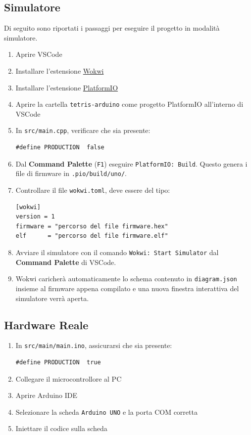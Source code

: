 \documentclass[a4paper, 12pt]{article}
\begin{document}
\subsection{Simulatore}
Di seguito sono riportati i passaggi per eseguire il progetto in modalità simulatore.
\begin{enumerate}
    \item Aprire VSCode
    \item Installare l'estensione \href{https://marketplace.visualstudio.com/items?itemName=Wokwi.wokwi-vscode}{Wokwi} \cite{wokwi}
    \item Installare l'estensione \href{https://marketplace.visualstudio.com/items?itemName=platformio.platformio-ide}{PlatformIO} \cite{platformio}
    \item Aprire la cartella \texttt{tetris-arduino} come progetto PlatformIO all'interno di VSCode
    \item In \texttt{src/main.cpp}, verificare che sia presente:
          \begin{lstlisting}
#define PRODUCTION  false
	      \end{lstlisting}
    \item Dal \textbf{Command Palette} (\texttt{F1}) eseguire \texttt{PlatformIO: Build}.
          Questo genera i file di firmware in \texttt{.pio/build/uno/}.
    \item Controllare il file \texttt{wokwi.toml}, deve essere del tipo:
          \begin{verbatim}
[wokwi]
version = 1
firmware = "percorso del file firmware.hex"
elf      = "percorso del file firmware.elf"
	      \end{verbatim}
    \item Avviare il simulatore con il comando \texttt{Wokwi: Start Simulator} dal \textbf{Command Palette} di VSCode.
    \item Wokwi caricherà automaticamente lo schema contenuto in \texttt{diagram.json} insieme al firmware appena compilato e una nuova finestra interattiva del simulatore verrà aperta.
\end{enumerate}

\subsection{Hardware Reale}
\begin{enumerate}
    \item In \texttt{src/main/main.ino}, assicurarsi che sia presente:
          \begin{lstlisting}
#define PRODUCTION  true
	      \end{lstlisting}
    \item Collegare il microcontrollore al PC
    \item Aprire Arduino IDE
    \item Selezionare la scheda \texttt{Arduino UNO} e la porta COM corretta
    \item Iniettare il codice sulla scheda
\end{enumerate}
\end{document}
